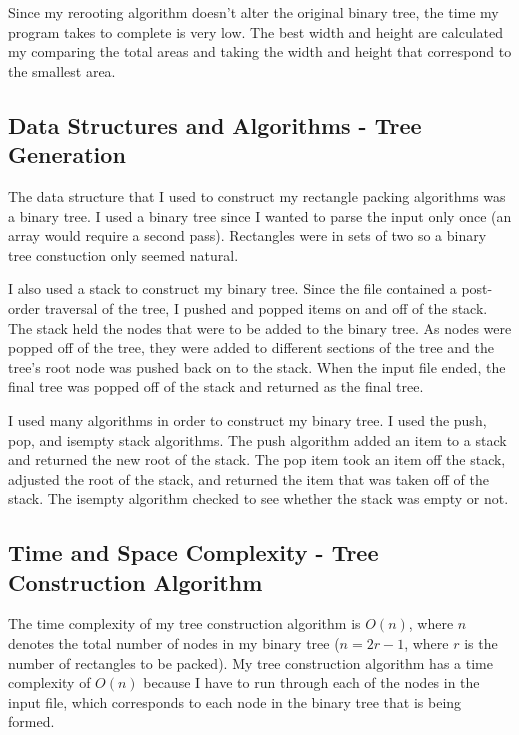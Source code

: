 \documentclass[10pt]{article}
\begin{document}
\noindent \newline Since my rerooting algorithm doesn't alter the original binary tree, the time my program takes to complete is very low.  The best width and height are calculated my comparing the total areas and taking the width and height that correspond to the smallest area.

\subsection*{Data Structures and Algorithms - Tree Generation}
The data structure that I used to construct my rectangle packing algorithms was a binary tree.  I used a binary tree since I wanted to parse the input only once (an array would require a second pass).
Rectangles were in sets of two so a binary tree constuction only seemed natural.

\noindent \newline I also used a stack to construct my binary tree. Since the file contained a post-order traversal of the tree, I pushed and popped items on and off of the stack.
The stack held the nodes that were to be added to the binary tree.  As nodes were popped off of the tree, they were added to different sections of the tree and the tree's root node was pushed back on to the stack.
When the input file ended, the final tree was popped off of the stack and returned as the final tree.

\noindent \newline I used many algorithms in order to construct my binary tree. I used the push, pop, and isempty stack algorithms. The push algorithm added an item to a stack and returned the new root of the stack. The pop item took an item off the stack, adjusted the root of the stack, and returned the item that was taken off of the stack. The isempty algorithm checked to see whether the stack was empty or not.

\subsection*{Time and Space Complexity - Tree Construction Algorithm}
The time complexity of my tree construction algorithm is $O(n)$, where $n$ denotes the total number of nodes in my binary tree ($n = 2r - 1$, where $r$ is the number of rectangles to be packed).
My tree construction algorithm has a time complexity of $O(n)$ because I have to run through each of the nodes in the input file, which corresponds to each node in the binary tree that is being formed.
\end{document}
